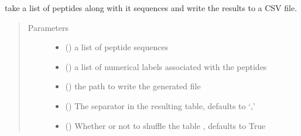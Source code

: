 \documentclass[letterpaper,10pt,english]{sphinxmanual}
\begin{document}
\begin{fulllineitems}
\label{\detokenize{IPTK.IO:IPTK.IO.OutFunctions.write_annotated_sequences}}
take a list of peptides along with it sequences and write the results to a CSV file.
\begin{quote}\begin{description}
\item[{Parameters}] \leavevmode\begin{itemize}
\item {} 
 (\sphinxstyleliteralemphasis{\sphinxupquote{{[}}}\sphinxstyleliteralemphasis{\sphinxupquote{{]}}}) \textendash{} a list of peptide sequences

\item {} 
 (\sphinxstyleliteralemphasis{\sphinxupquote{{[}}}\sphinxstyleliteralemphasis{\sphinxupquote{{]}}}) \textendash{} a list of numerical labels associated with the peptides

\item {} 
 () \textendash{} the path to write the generated file

\item {} 
 (\sphinxstyleliteralemphasis{\sphinxupquote{, }}) \textendash{} The separator in the resulting table,  defaults to ‘,’

\item {} 
 (\sphinxstyleliteralemphasis{\sphinxupquote{, }}) \textendash{} Whether or not to shuffle the table , defaults to True


\end{itemize}
\end{description}
\end{quote}
\end{fulllineitems}
\end{document}
